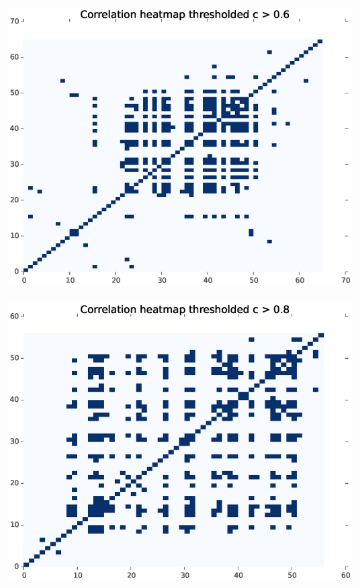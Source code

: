 \documentclass[11pt]{article}
\begin{document}
\begin{figure}
    \centering
    \begin{subfigure}{.48\textwidth}
        \centering
        \includegraphics[width=\linewidth]{plots/tuningCorr_desc_civar_thres}
    \end{subfigure}
    \begin{subfigure}{.48\textwidth}
        \centering
        \includegraphics[width=\linewidth]{plots/tuningCorr_desc_civar_thres_m2}
    \end{subfigure}
    \newline
    \begin{subfigure}{.48\textwidth}

\end{subfigure}
\end{figure}
\end{document}
